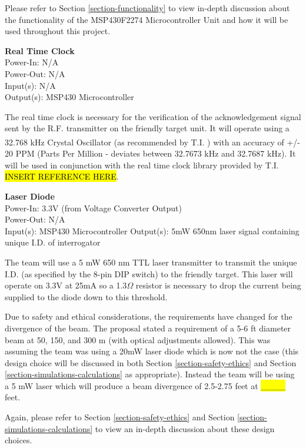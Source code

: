 \documentclass[letterpaper,10pt]{article}
\begin{document}
\begin{spacing}{1.15}
Please refer to Section \ref{section-functionality} to view in-depth discussion about the functionality of the MSP430F2274 Microcontroller Unit and how it will be used throughout this project.

\normalsize\textbf{Real Time Clock}\\
Power-In: N/A \\
Power-Out: N/A \\
Input(s): N/A \\
Output(s): MSP430 Microcontroller

The real time clock is necessary for the verification of the acknowledgement signal sent by the R.F. transmitter on the friendly target unit. It will operate using a 32.768 kHz Crystal Oscillator (as recommended by T.I. \textsuperscript{\cite{RTC-Implementation}}) with an accuracy of +/- 20 PPM (Parts Per Million - deviates between 32.7673 kHz and 32.7687 kHz). It will be used in conjunction with the real time clock library provided by T.I. \hl{INSERT REFERENCE HERE}.

\normalsize\textbf{Laser Diode}\\
Power-In: 3.3V (from Voltage Converter Output) \\
Power-Out: N/A \\
Input(s): MSP430 Microcontroller
Output(s):  5mW 650nm laser signal containing unique I.D. of interrogator 

The team will use a 5 mW 650 nm TTL laser transmitter to transmit the unique I.D. (as specified by the 8-pin DIP switch) to the friendly target. This laser will operate on 3.3V at 25mA so a 1.3$\Omega$  resistor is necessary to drop the current being supplied to the diode down to this threshold. 

Due to safety and ethical considerations, the requirements have changed for the divergence of the beam. The proposal stated a requirement of a 5-6 ft diameter beam at 50, 150, and 300 m (with optical adjustments allowed). This was assuming the team was using a 20mW laser diode which is now not the case (this design choice will  be discussed in both Section \ref{section-safety-ethics} and Section \ref{section-simulations-calculations} as appropriate). Instead the team will be using a 5 mW laser which will produce a beam divergence of 2.5-2.75 feet at \hl{\_\_\_\_} feet. 

Again, please refer to Section \ref{section-safety-ethics} and Section \ref{section-simulations-calculations} to view an in-depth discussion about these design choices.


\end{spacing}
\end{document}
